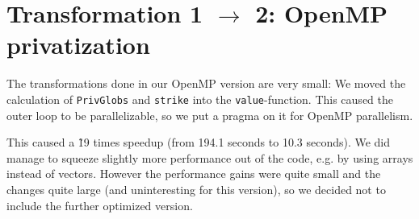 \section{Transformation 1 $\rightarrow$ 2: OpenMP privatization}

The transformations done in our OpenMP version are very small: We
moved the calculation of \texttt{PrivGlobs} and \texttt{strike} into
the \texttt{value}-function. This caused the outer loop to be
parallelizable, so we put a pragma on it for OpenMP parallelism.

This caused a \~19 times speedup (from 194.1 seconds to 10.3 seconds).
We did manage to squeeze slightly more performance out of the code,
e.g. by using arrays instead of vectors. However the performance gains
were quite small and the changes quite large (and uninteresting for this
version), so we decided not to include the further optimized version.
